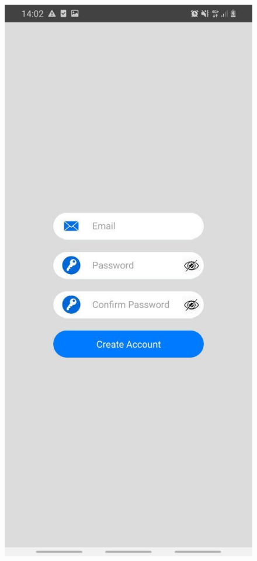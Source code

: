 \begin{figure}[h!]
\begin{minipage}[t]{0.48\textwidth}
\includegraphics[width=\linewidth,keepaspectratio=true]{img/login.jpg}

\end{minipage}
\end{figure}
